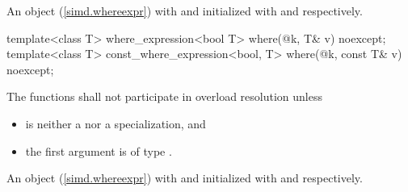 \begin{wgText}
\begin{itemdescr}
  \pnum\returns
  An object (\ref{simd.whereexpr}) with  and  initialized with  and  respectively.
\end{itemdescr}

\begin{itemdecl}
template<class T>
  where_expression<bool T>
    where(@\seebelow@ k, T& v) noexcept;
template<class T>
  const_where_expression<bool, T>
    where(@\seebelow@ k, const T& v) noexcept;
\end{itemdecl}

\begin{itemdescr}
  \pnum\remarks
  The functions shall not participate in overload resolution unless

  \begin{itemize}
    \item {} is neither a  nor a  specialization, and
    \item the first argument is of type .
  \end{itemize}

  \pnum\returns
  An object (\ref{simd.whereexpr}) with  and  initialized with  and  respectively.
\end{itemdescr}
\end{wgText}

